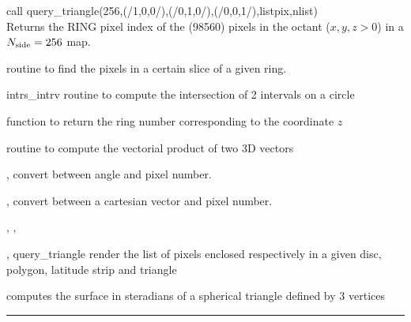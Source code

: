 \begin{example}
{
call query\_triangle(256,(/1,0,0/),(/0,1,0/),(/0,0,1/),listpix,nlist)  \\
}
{
Returns the RING pixel index of the (98560) pixels in the octant ($x,y,z>0$) in a ${N_{\rm side}}=256$ map.
}
\end{example}
\begin{modules}
  \begin{sulist}{} %
 \item[\htmlref{in\_ring}{sub:in_ring}] routine to find the pixels in a certain slice of a given ring.		
 \item[intrs\_intrv] routine to compute the intersection of 2 intervals on a circle
 \item[\htmlref{ring\_num}{sub:ring_num}] function to return the ring number corresponding to the coordinate $z$
 \item[\htmlref{vect\_prod}{sub:vect_prod}] routine to compute the vectorial product of two 3D vectors
  \end{sulist}
\end{modules}

\begin{related}
  \begin{sulist}{} %
  \item[\htmlref{pix2ang}{sub:pix_tools}, \htmlref{ang2pix}{sub:pix_tools}] convert between angle and pixel number.
  \item[\htmlref{pix2vec}{sub:pix_tools}, \htmlref{vec2pix}{sub:pix_tools}] convert between a cartesian vector and pixel number.
  \item[\htmlref{query\_disc}{sub:query_disc}, \htmlref{query\_polygon}{sub:query_polygon},]
  \item[\htmlref{query\_strip}{sub:query_strip}, query\_triangle] render the list of pixels enclosed
  respectively in a given disc, polygon, latitude strip and triangle
  \item[\htmlref{surface\_triangle}{sub:surface_triangle}] computes the surface
in steradians of a spherical triangle defined by 3 vertices

  \end{sulist}
\end{related}

\rule{\hsize}{2mm}

\newpage
